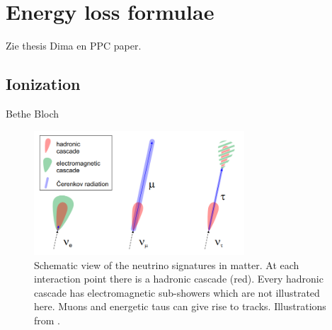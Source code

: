 \section{Energy loss formulae}
\label{sec:energyloss}
Zie thesis Dima en PPC paper.
\subsection{Ionization}
Bethe Bloch
\begin{figure}
\label{fig:ICinteractions}
\centering
\includegraphics[width=0.7\textwidth]{chapter4/img/ICinteractions.png}
\caption{Schematic view of the neutrino signatures in matter. At each interaction point there is a hadronic cascade (red). Every hadronic cascade has electromagnetic sub-showers which are not illustrated here. Muons and energetic taus can give rise to tracks. Illustrations from \cite{Wallraff}.}
\end{figure}

